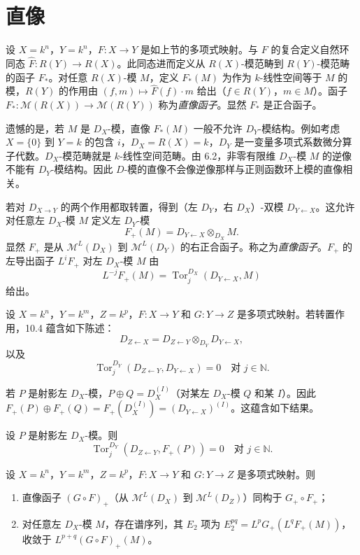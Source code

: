 \section{直像}

设 $X=k^n$，$Y=k^n$，$F:X\to Y$ 是如上节的多项式映射。与 $F$ 的复合定义自然环同态 $\widehat F:R(Y)\to R(X)$。此同态进而定义从 $R(X)$-模范畴到 $R(Y)$-模范畴的函子 $F_*$。对任意 $R(X)$-模 $M$，定义 $F_*(M)$ 为作为 $k$-线性空间等于 $M$ 的模，$R(Y)$ 的作用由 $(f,m)\longmapsto\widehat F(f)\cdot m$ 给出（$f\in R(Y)$，$m\in M$）。函子 $F_*:\mathcal{M}(R(X))\to\mathcal{M}(R(Y))$ 称为\emph{直像函子}。显然 $F_*$ 是正合函子。

遗憾的是，若 $M$ 是 $D_X$-模，直像 $F_*(M)$ 一般不允许 $D_Y$-模结构。例如考虑 $X=\{0\}$ 到 $Y=k$ 的包含 $i$，$D_X=R(X)=k$，$D_Y$ 是一变量多项式系数微分算子代数。$D_X$-模范畴就是 $k$-线性空间范畴。由 6.2，非零有限维 $D_X$-模 $M$ 的逆像不能有 $D_Y$-模结构。因此 $D$-模的直像不会像逆像那样与正则函数环上模的直像相关。

若对 $D_{X\to Y}$ 的两个作用都取转置，得到（左 $D_Y$，右 $D_X$）-双模 $D_{Y\leftarrow X}$。这允许对任意左 $D_X$-模 $M$ 定义左 $D_Y$-模
$$F_+(M)=D_{Y\leftarrow X}\otimes_{D_X}M.$$
显然 $F_+$ 是从 $\mathcal{M}^L(D_X)$ 到 $\mathcal{M}^L(D_Y)$ 的右正合函子。称之为\emph{直像函子}。$F_+$ 的左导出函子 $L^iF_+$ 对左 $D_X$-模 $M$ 由
$$L^{-j}F_+(M)=\operatorname{Tor}^{D_X}_j(D_{Y\leftarrow X},M)$$
给出。

设 $X=k^n$，$Y=k^m$，$Z=k^p$，$F:X\to Y$ 和 $G:Y\to Z$ 是多项式映射。若转置作用，10.4 蕴含如下陈述：
$$D_{Z\leftarrow X}=D_{Z\leftarrow Y}\otimes_{D_Y}D_{Y\leftarrow X},$$
以及
$$\operatorname{Tor}^{D_Y}_j(D_{Z\leftarrow Y},D_{Y\leftarrow X})=0\quad\text{对 }j\in\mathbb{N}.$$

若 $P$ 是射影左 $D_X$-模，$P\oplus Q=D_X^{(I)}$（对某左 $D_X$-模 $Q$ 和某 $I$）。因此 $F_+(P)\oplus F_+(Q)=F_+(D_X^{(I)})=(D_{Y\leftarrow X})^{(I)}$。这蕴含如下结果。

\begin{lemma}
设 $P$ 是射影左 $D_X$-模。则
$$\operatorname{Tor}^{D_Y}_j(D_{Z\leftarrow Y},F_+(P))=0\quad\text{对 }j\in\mathbb{N}.$$
\end{lemma}

\begin{theorem}
设 $X=k^n$，$Y=k^m$，$Z=k^p$，$F:X\to Y$ 和 $G:Y\to Z$ 是多项式映射。则
\begin{enumerate}[label=(\roman*)]
  \item 直像函子 $(G\circ F)_+$（从 $\mathcal{M}^L(D_X)$ 到 $\mathcal{M}^L(D_Z)$）同构于 $G_+\circ F_+$；
  \item 对任意左 $D_X$-模 $M$，存在谱序列，其 $E_2$ 项为 $E_2^{pq}=L^pG_+(L^qF_+(M))$，收敛于 $L^{p+q}(G\circ F)_+(M)$。
\end{enumerate}
\end{theorem}

